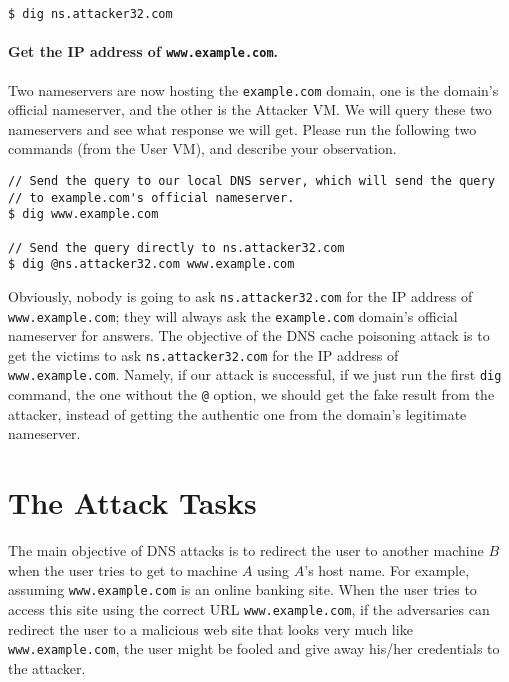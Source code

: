 \begin{lstlisting}
$ dig ns.attacker32.com
\end{lstlisting}



\paragraph{Get the IP address of \texttt{www.example.com}.} 
Two nameservers are now hosting the \texttt{example.com} 
domain, one is the domain's official nameserver, and the other 
is the Attacker VM. We will query these two nameservers and see what 
response we will get. 
Please run the following two commands (from the User VM), 
and describe your observation. 


\begin{lstlisting}
// Send the query to our local DNS server, which will send the query
// to example.com's official nameserver. 
$ dig www.example.com

// Send the query directly to ns.attacker32.com 
$ dig @ns.attacker32.com www.example.com
\end{lstlisting}
 


Obviously, nobody is going to ask \texttt{ns.attacker32.com} for 
the IP address of \texttt{www.example.com}; they will always ask
the \texttt{example.com} domain's official nameserver for 
answers. The objective of the DNS cache poisoning attack
is to get the victims to ask 
\texttt{ns.attacker32.com} for the IP address of 
\texttt{www.example.com}. Namely, if our attack is successful, 
if we just run the first \texttt{dig} command, the one
without the \texttt{@} option, we should get the 
fake result from the attacker, instead of getting 
the authentic one from the domain's legitimate nameserver.




\section{The Attack Tasks}


The main objective of DNS attacks is to redirect the user
to another machine $B$ when the user tries to get to machine $A$ using
$A$'s host name. For example, assuming {\tt www.example.com} is an online banking 
site.  When the user tries to access this site using the
correct URL {\tt www.example.com}, if the adversaries can redirect the user 
to a malicious web site that looks very much like 
{\tt www.example.com}, the user might be fooled and give away 
his/her credentials to the attacker. 


